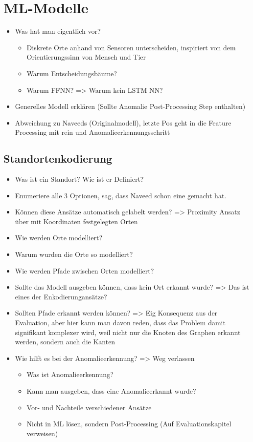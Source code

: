 \chapter{ML-Modelle}
\begin{itemize}
    \item Was hat man eigentlich vor?
    \begin{itemize}
        \item Diskrete Orte anhand von Sensoren unterscheiden, inspiriert von dem Orientierungssinn von Mensch und Tier
        \item Warum Entscheidungsbäume?
        \item Warum FFNN? => Warum kein LSTM NN?
    \end{itemize}
    \item Generelles Modell erklären (Sollte Anomalie Post-Processing Step enthalten)
    \item Abweichung zu Naveeds (Originalmodell), letzte Pos geht in die Feature Processing mit rein und Anomalieerkennungsschritt
\end{itemize}

\section{Standortenkodierung}
\begin{itemize}
    \item Was ist ein Standort? Wie ist er Definiert?
    \item Enumeriere alle 3 Optionen, sag, dass Naveed schon eine gemacht hat.
    \item Können diese Ansätze automatisch gelabelt werden? => Proximity Ansatz über mit Koordinaten festgelegten Orten
    \item Wie werden Orte modelliert?
    \item Warum wurden die Orte so modelliert?
    \item Wie werden Pfade zwischen Orten modelliert?
    \item Sollte das Modell ausgeben können, dass kein Ort erkannt wurde? => Das ist eines der Enkodierungansätze?
    \item Sollten Pfade erkannt werden können? => Eig Konsequenz aus der Evaluation, aber hier kann man davon reden, dass das Problem damit signifikant komplexer wird,
          weil nicht nur die Knoten des Graphen erkannt werden, sondern auch die Kanten
    \item Wie hilft es bei der Anomalieerkennung? => Weg verlassen
    \begin{itemize}
        \item Was ist Anomalieerkennung?
        \item Kann man ausgeben, dass eine Anomalieerkannt wurde?
        \item Vor- und Nachteile verschiedener Ansätze
        \item Nicht in ML lösen, sondern Post-Processing (Auf Evaluationskapitel verweisen)
    \end{itemize}
\end{itemize}


